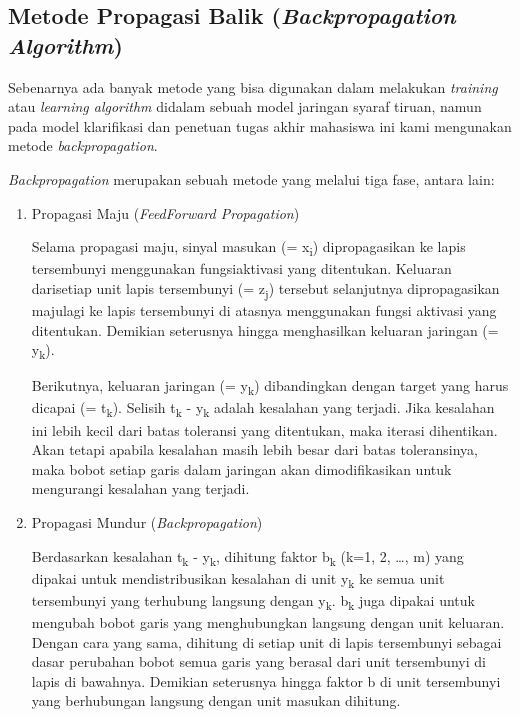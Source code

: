 \subsection{Metode Propagasi Balik (\emph{Backpropagation Algorithm})}
Sebenarnya ada banyak metode yang bisa digunakan dalam melakukan \emph{training} atau \emph{learning algorithm} didalam sebuah model jaringan syaraf tiruan, namun pada model klarifikasi dan penetuan tugas akhir mahasiswa ini kami mengunakan metode \emph{backpropagation}. \par 
\emph{Backpropagation} merupakan sebuah metode yang melalui tiga fase, antara lain:
\begin{enumerate}
	\item Propagasi Maju (\emph{FeedForward Propagation}) \par 
	Selama propagasi maju, sinyal masukan (= x\textsubscript{i}) dipropagasikan ke lapis tersembunyi menggunakan fungsiaktivasi yang ditentukan. Keluaran darisetiap unit lapis tersembunyi (= z\textsubscript{j}) tersebut selanjutnya dipropagasikan majulagi ke lapis tersembunyi di atasnya menggunakan fungsi aktivasi yang ditentukan. Demikian seterusnya hingga menghasilkan keluaran jaringan (= y\textsubscript{k}). \par 
	Berikutnya, keluaran jaringan (= y\textsubscript{k}) dibandingkan dengan target yang harus
	dicapai (= t\textsubscript{k}). Selisih t\textsubscript{k} - y\textsubscript{k} adalah kesalahan yang terjadi. Jika kesalahan ini lebih kecil dari batas toleransi yang ditentukan, maka iterasi dihentikan. Akan tetapi apabila kesalahan masih lebih besar dari batas toleransinya, maka bobot setiap garis dalam jaringan akan dimodifikasikan untuk mengurangi kesalahan yang terjadi.
	
	\item Propagasi Mundur (\emph{Backpropagation}) \par 
	Berdasarkan kesalahan t\textsubscript{k} - y\textsubscript{k}, dihitung faktor b\textsubscript{k} (k=1, 2, …, m) yang dipakai	untuk mendistribusikan kesalahan di unit y\textsubscript{k} ke semua unit tersembunyi yang terhubung langsung dengan y\textsubscript{k}. b\textsubscript{k} juga dipakai untuk mengubah bobot garis yang menghubungkan langsung dengan unit keluaran. Dengan cara yang sama, dihitung di setiap unit di lapis tersembunyi sebagai dasar perubahan bobot semua garis yang berasal dari unit tersembunyi di lapis di bawahnya. Demikian seterusnya hingga faktor b di unit tersembunyi yang berhubungan langsung dengan unit masukan dihitung. 
	

\end{enumerate}
